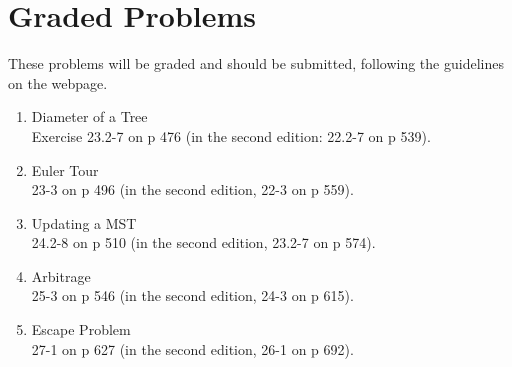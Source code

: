 \documentclass[11pt]{article}
\begin{document}
\section*{Graded Problems}

These problems will be graded and should be submitted, following the
guidelines on the webpage.

\begin{enumerate}
    \item Diameter of a Tree\\
	Exercise 23.2-7 on p 476 (in the second edition: 22.2-7 on p 539).
    \item Euler Tour\\
	23-3 on p 496 (in the second edition, 22-3 on p 559).
    \item Updating a MST\\
	24.2-8 on p 510
	(in the second edition, 
	23.2-7 on p 574).
    \item Arbitrage\\
	25-3 on p 546
	(in the second edition, 24-3 on p 615).
    \item Escape Problem\\
	27-1 on p 627
	(in the second edition, 26-1 on p 692).
\end{enumerate}
\end{document}
